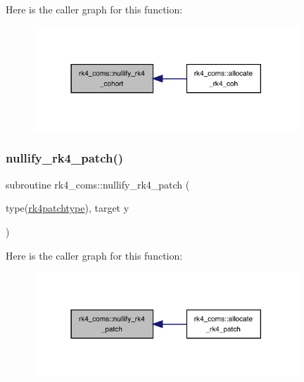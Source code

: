 Here is the caller graph for this function\+:
\nopagebreak
\begin{figure}[H]
\begin{center}
\leavevmode
\includegraphics[width=282pt]{namespacerk4__coms_afe54efd0ad9ab38983314ca0d2557e26_icgraph}
\end{center}
\end{figure}
\mbox{\label{namespacerk4__coms_a34a6a346af3d032c14f416435801598a}} 
\subsubsection{\texorpdfstring{nullify\+\_\+rk4\+\_\+patch()}{nullify\_rk4\_patch()}}
{\footnotesize\ttfamily subroutine rk4\+\_\+coms\+::nullify\+\_\+rk4\+\_\+patch (\begin{DoxyParamCaption}\item[{type(\hyperlink{structrk4__coms_1_1rk4patchtype}{rk4patchtype}), target}]{y }\end{DoxyParamCaption})}

Here is the caller graph for this function\+:
\nopagebreak
\begin{figure}[H]
\begin{center}
\leavevmode
\includegraphics[width=282pt]{namespacerk4__coms_a34a6a346af3d032c14f416435801598a_icgraph}
\end{center}
\end{figure}
\mbox{\label{namespacerk4__coms_aa58f2e011f087e610d94022bed90be7a}} 
